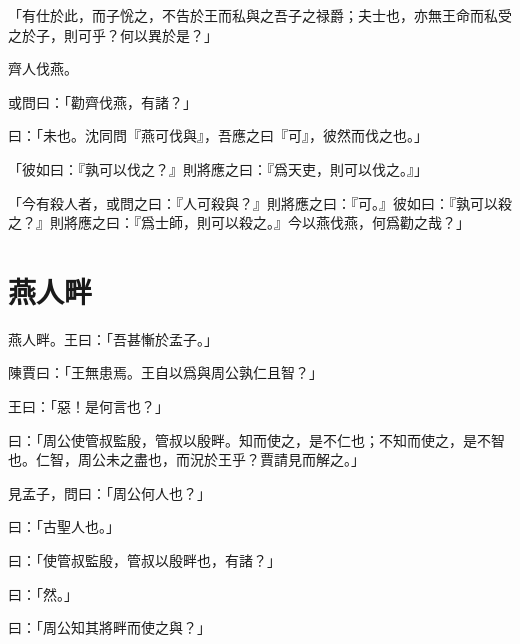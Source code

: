 「有仕於此，而子恱之，不告於王而私與之吾子之禄爵；夫士也，亦無王命而私受之於子，則可乎？何以異於是？」

齊人伐燕。

或問曰：「勸齊伐燕，有諸？」

曰：「未也。沈同問『燕可伐與』，吾應之曰『可』，彼然而伐之也。」

「彼如曰：『孰可以伐之？』則將應之曰：『爲天吏，則可以伐之。』」

「今有殺人者，或問之曰：『人可殺與？』則將應之曰：『可。』彼如曰：『孰可以殺之？』則將應之曰：『爲士師，則可以殺之。』今以燕伐燕，何爲勸之哉？」\par {}

\section{燕人畔}

燕人畔。王曰：「吾甚慚於孟子。」

陳賈曰：「王無患焉。王自以爲與周公孰仁且智？」

王曰：「惡！是何言也？」

曰：「周公使管叔監殷，管叔以殷畔。知而使之，是不仁也；不知而使之，是不智也。仁智，周公未之盡也，而況於王乎？賈請見而解之。」

見孟子，問曰：「周公何人也？」

曰：「古聖人也。」

曰：「使管叔監殷，管叔以殷畔也，有諸？」

曰：「然。」

曰：「周公知其將畔而使之與？」

